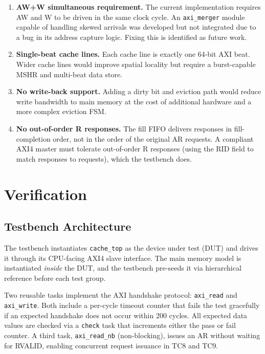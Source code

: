 \documentclass[12pt,letterpaper]{report}
\begin{document}
\begin{enumerate}[label=\arabic*.]
  \item \textbf{AW+W simultaneous requirement.}  The current
        implementation requires AW and W to be driven in the same
        clock cycle.  An \texttt{axi\_merger} module capable of
        handling skewed arrivals was developed but not integrated due
        to a bug in its address capture logic.  Fixing this is
        identified as future work.
  \item \textbf{Single-beat cache lines.}  Each cache line is exactly
        one 64-bit AXI beat.  Wider cache lines would improve spatial
        locality but require a burst-capable MSHR and multi-beat data
        store.
  \item \textbf{No write-back support.}  Adding a dirty bit and
        eviction path would reduce write bandwidth to main memory at
        the cost of additional hardware and a more complex eviction
        FSM.
  \item \textbf{No out-of-order R responses.}  The fill FIFO delivers
        responses in fill-completion order, not in the order of the
        original AR requests.  A compliant AXI4 master must tolerate
        out-of-order R responses (using the RID field to match
        responses to requests), which the testbench does.
\end{enumerate}

\chapter{Verification}
\label{ch:verification}

\section{Testbench Architecture}

The testbench instantiates \texttt{cache\_top} as the device under
test (DUT) and drives it through its CPU-facing AXI4 slave interface.
The main memory model is instantiated \emph{inside} the DUT, and the
testbench pre-seeds it via hierarchical reference before each test
group.

Two reusable tasks implement the AXI handshake protocol:
\texttt{axi\_read} and \texttt{axi\_write}.  Both include a per-cycle
timeout counter that fails the test gracefully if an expected handshake
does not occur within 200 cycles.  All expected data values are checked
via a \texttt{check} task that increments either the pass or fail
counter.  A third task, \texttt{axi\_read\_nb} (non-blocking), issues
an AR without waiting for RVALID, enabling concurrent request issuance
in TC8 and TC9.
\end{document}
